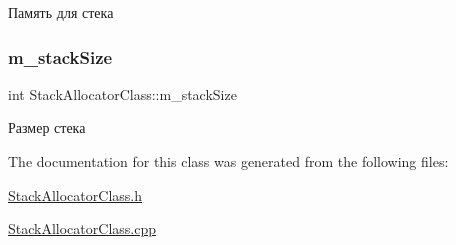 Память для стека 

\mbox{\label{class_stack_allocator_class_a81800fd71839363c4149b66223b74420}} 
\subsubsection{\texorpdfstring{m\+\_\+stack\+Size}{m\_stackSize}}
{\footnotesize\ttfamily int Stack\+Allocator\+Class\+::m\+\_\+stack\+Size\hspace{0.3cm}{\ttfamily [private]}}



Размер стека 



The documentation for this class was generated from the following files\+:\begin{DoxyCompactItemize}
\item 
\hyperlink{_stack_allocator_class_8h}{Stack\+Allocator\+Class.\+h}\item 
\hyperlink{_stack_allocator_class_8cpp}{Stack\+Allocator\+Class.\+cpp}\end{DoxyCompactItemize}
